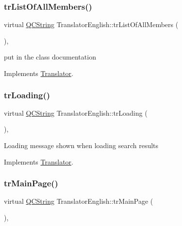 \subsubsection{\texorpdfstring{trListOfAllMembers()}{trListOfAllMembers()}}
{\footnotesize\ttfamily virtual \mbox{\hyperlink{class_q_c_string}{Q\+C\+String}} Translator\+English\+::tr\+List\+Of\+All\+Members (\begin{DoxyParamCaption}{ }\end{DoxyParamCaption})\hspace{0.3cm}{\ttfamily [inline]}, {\ttfamily [virtual]}}

put in the class documentation 

Implements \mbox{\hyperlink{class_translator}{Translator}}.

\mbox{\label{class_translator_english_afb0068f610c75c4ca4e5a59143deb7f2}} 
\subsubsection{\texorpdfstring{trLoading()}{trLoading()}}
{\footnotesize\ttfamily virtual \mbox{\hyperlink{class_q_c_string}{Q\+C\+String}} Translator\+English\+::tr\+Loading (\begin{DoxyParamCaption}{ }\end{DoxyParamCaption})\hspace{0.3cm}{\ttfamily [inline]}, {\ttfamily [virtual]}}

Loading message shown when loading search results 

Implements \mbox{\hyperlink{class_translator}{Translator}}.

\mbox{\label{class_translator_english_a1bc26c1658f2a0705ba000906a764ffc}} 
\subsubsection{\texorpdfstring{trMainPage()}{trMainPage()}}
{\footnotesize\ttfamily virtual \mbox{\hyperlink{class_q_c_string}{Q\+C\+String}} Translator\+English\+::tr\+Main\+Page (\begin{DoxyParamCaption}{ }\end{DoxyParamCaption})\hspace{0.3cm}{\ttfamily [inline]}, {\ttfamily [virtual]}}

